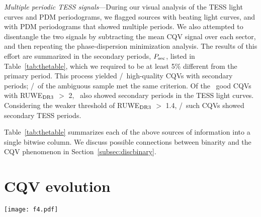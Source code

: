 \documentclass[11pt,twocolumn,tighten]{aastex63}
\begin{document}
{\it Multiple periodic TESS signals}---During our visual analysis of
the TESS light curves and PDM periodograms, we flagged sources with
beating light curves, and with PDM periodograms that showed multiple
periods.  We also attempted to disentangle the two signals by
subtracting the mean CQV signal over each sector, and then repeating
the phase-dispersion minimization analysis.  The results of this effort
are summarized in the secondary periods, $P_{\rm sec}$, listed in
Table~\ref{tab:thetable}, which we required to be at least 5\%
different from the primary period.  This process yielded
\ngoodmultperiodflag/\ngoods\ high-quality CQVs with secondary
periods; \nmaybemultperiodflag/\nmaybes\ of the ambiguous sample met
the same criterion.  Of the \ngoodhighruwe\ good CQVs with RUWE$_{\rm
DR3}$ $>$ 2, \ngoodruweandmultperiod\ also showed secondary periods in
the TESS light curves.  Considering the weaker threshold of RUWE$_{\rm
DR3}$ $>$ 1.4, \ngoodweakruweandmultperiod/\ngoodweakruwe\ such CQVs
showed secondary TESS periods.

Table~\ref{tab:thetable} summarizes each of the above sources of
information into a single bitwise column.  We discuss possible
connections between binarity and the CQV phenomenon in
Section~\ref{subsec:discbinary}.


\section{CQV evolution}
\label{sec:evoln}

\begin{figure*}[!tp]
	\begin{center}
		\centering
		\texttt{[image: f4.pdf]}
		\vspace{-0.6cm}
		\caption{
			{\bf CQVs keep their periods but change their shapes.}
			Out of the \ngoods\ CQVs in Figure~\ref{fig:cqvs}, 32 had
			120-second cadence TESS data available for a baseline of at
			least two years; the 27 brightest are shown here due to space
			constraints.  Each panel shows one sector of TESS data, and is
			phased to its deepest minimum in flux.  Each panel's title shows
			the TIC identifier and approximate period in hours.  Text insets
			show the TESS sector numbers, which generally span two years, or
			at least 1{,}000 cycles.  The vertical scale is fixed across
			sectors to clarify shape changes.  Gray circles are raw 2-minute
			data; colored circles bin to 300 points per cycle. 
		}
		\label{fig:evoln}
	\end{center}
\end{figure*}
\end{document}
